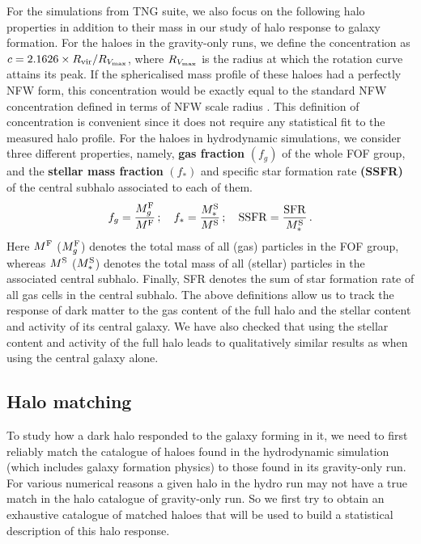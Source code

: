 For the simulations from TNG suite, we also focus on the following halo properties in addition to their mass in our study of halo response to galaxy formation. 
For the haloes in the gravity-only runs, we define the concentration as $c=2.1626 \times R_{\rm vir}/R_{V_{\rm{max}}}$, where $R_{V_{\rm{max}}}$ is the radius at which the rotation curve attains its peak. If the sphericalised mass profile of these haloes had a perfectly NFW form, this concentration would be exactly equal to the standard NFW concentration defined in terms of NFW scale radius \citep[see equation 5 of ][]{1996ApJ...462..563N}. 
This definition of concentration is convenient since it does not require any statistical fit to the measured halo profile.
For the haloes in hydrodynamic simulations, we consider 
three different properties, namely, \textbf{gas fraction} $(f_g)$ of the whole FOF group, and the \textbf{stellar mass fraction} $(f_{\ast})$ and specific star formation rate \textbf{(SSFR)} of the central subhalo associated to each of them. 
\begin{align}
    f_{g} = \frac{M_{g}^{\rm{F}}}{M^{\rm{F}}}\,; \quad
    f_{\ast} = \frac{M_{\ast}^{\rm{S}}}{M^{\rm{S}}}\,; \quad {\rm SSFR} = \frac{\rm{SFR}}{M_{\ast}^{\rm{S}}}\,.
\label{eq:galpropdefs-ch:simbase}
\end{align}
Here $M^{\rm{F}}$ ($M_{g}^{\rm{F}}$) denotes the total mass of all (gas) particles in the FOF group, whereas $M^{\rm{S}}$ ($M_{\ast}^{\rm{S}}$) denotes the total mass of all (stellar) particles in the associated central subhalo. 
Finally, SFR denotes the sum of star formation rate of all gas cells in the central subhalo. The above definitions allow us to track the response of dark matter to the gas content of the full halo and the stellar content and activity of its central galaxy. We have also checked that using the stellar content and activity of the full halo leads to qualitatively similar results as when using the central galaxy alone.


\subsection{Halo matching}
\label{sec:methods-match-ch:simbase}
To study how a dark halo responded to the galaxy forming in it, we need to first reliably match the catalogue of haloes found in the hydrodynamic simulation (which includes galaxy formation physics) to those found in its gravity-only run. For various numerical reasons a given halo in the hydro run may not have a true match in the halo catalogue of gravity-only run. So we first try to obtain an exhaustive catalogue of matched haloes that will be used to build a statistical description of this halo response.


